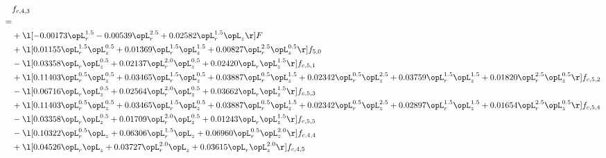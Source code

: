 \begin{alignat}{2} 
\label{eq:f_43_2} 
& f_{c,4,3} \nonumber \\ 
 = \\ 
& + \l[  -0.00173 \opL_r^{1.5}   -0.00539 \opL_r^{2.5} +  0.02582 \opL_r^{1.5} \opL_z  \r] F \nonumber \\ 
& + \l[  0.01155 \opL_r^{1.5} \opL_z^{0.5} +  0.01369 \opL_r^{1.5} \opL_z^{1.5} +  0.00827 \opL_r^{2.5} \opL_z^{0.5}  \r] f_{5,0} \nonumber \\ 
& - \l[  0.03358 \opL_r \opL_z^{0.5} +  0.02137 \opL_r^{2.0} \opL_z^{0.5} +  0.02420 \opL_r \opL_z^{1.5}  \r] f_{c,5,1} \nonumber \\ 
& + \l[  0.11403 \opL_r^{0.5} \opL_z^{0.5} +  0.03465 \opL_r^{1.5} \opL_z^{0.5} +  0.03887 \opL_r^{0.5} \opL_z^{1.5} +  0.02342 \opL_r^{0.5} \opL_z^{2.5} +  0.03759 \opL_r^{1.5} \opL_z^{1.5} +  0.01820 \opL_r^{2.5} \opL_z^{0.5}  \r] f_{c,5,2} \nonumber \\ 
& - \l[  0.06716 \opL_r \opL_z^{0.5} +  0.02564 \opL_r^{2.0} \opL_z^{0.5} +  0.03662 \opL_r \opL_z^{1.5}  \r] f_{c,5,3} \nonumber \\ 
& + \l[  0.11403 \opL_r^{0.5} \opL_z^{0.5} +  0.03465 \opL_r^{1.5} \opL_z^{0.5} +  0.03887 \opL_r^{0.5} \opL_z^{1.5} +  0.02342 \opL_r^{0.5} \opL_z^{2.5} +  0.02897 \opL_r^{1.5} \opL_z^{1.5} +  0.01654 \opL_r^{2.5} \opL_z^{0.5}  \r] f_{c,5,4} \nonumber \\ 
& - \l[  0.03358 \opL_r \opL_z^{0.5} +  0.01709 \opL_r^{2.0} \opL_z^{0.5} +  0.01243 \opL_r \opL_z^{1.5}  \r] f_{c,5,5} \nonumber \\ 
& - \l[  0.10322 \opL_r^{0.5} \opL_z +  0.06306 \opL_r^{1.5} \opL_z +  0.06960 \opL_r^{0.5} \opL_z^{2.0}  \r] f_{c,4,4} \nonumber \\ 
& + \l[  0.04526 \opL_r \opL_z +  0.03727 \opL_r^{2.0} \opL_z +  0.03615 \opL_r \opL_z^{2.0}  \r] f_{c,4,5} \nonumber \\ 
\end{alignat} 


